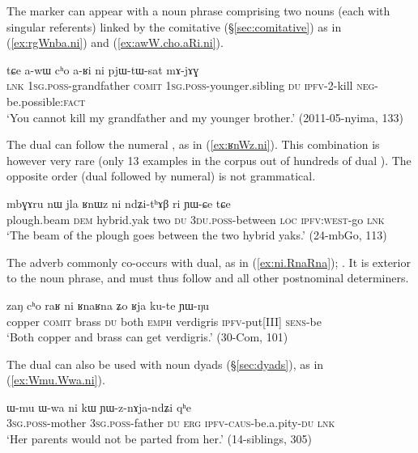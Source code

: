 The marker  can appear with a noun phrase comprising two nouns (each with singular referents) linked by the comitative  (§\ref{sec:comitative}) as in (\ref{ex:rgWnba.ni}) and (\ref{ex:awW.cho.aRi.ni}).

\begin{exe}
	\ex \label{ex:awW.cho.aRi.ni}
	\gll  tɕe a-wɯ cʰo a-ʁi ni pjɯ-tɯ-sat mɤ-jɤɣ \\
	\textsc{lnk} \textsc{1sg}.\textsc{poss}-grandfather \textsc{comit} \textsc{1sg}.\textsc{poss}-younger.sibling \textsc{du} \textsc{ipfv}-2-kill \textsc{neg}-be.possible:\textsc{fact} \\
	\glt `You cannot kill my grandfather and my younger brother.' (2011-05-nyima, 133)
\end{exe}

The dual can follow the numeral , as in (\ref{ex:ʁnWz.ni}). This combination is however very rare (only 13 examples in the corpus out of hundreds of dual ). The opposite order (dual followed by numeral) is not grammatical.

\begin{exe}
\ex \label{ex:ʁnWz.ni}
\gll mbɣɤru nɯ jla ʁnɯz ni ndʑi-tʰɤβ ri ɲɯ-ɕe tɕe \\
plough.beam \textsc{dem} hybrid.yak two \textsc{du} \textsc{3du}.\textsc{poss}-between \textsc{loc} \textsc{ipfv}:\textsc{west}-go \textsc{lnk} \\
\glt `The beam of the plough goes between the two hybrid yaks.' (24-mbGo, 113)
\end{exe}


The adverb  commonly co-occurs with dual, as in (\ref{ex:ni.RnaRna});
. It is exterior to the noun phrase, and must thus follow  and all other postnominal determiners.

\begin{exe}
\ex \label{ex:ni.RnaRna}
\gll zaŋ cʰo raʁ ni ʁnaʁna ʑo ʁja ku-te ɲɯ-ŋu \\
copper \textsc{comit} brass \textsc{du} both \textsc{emph} verdigris \textsc{ipfv}-put[III] \textsc{sens}-be \\
\glt `Both copper and brass can get verdigris.' (30-Com, 101)
\end{exe}

The dual can also be used with noun dyads (§\ref{sec:dyads}), as in (\ref{ex:Wmu.Wwa.ni}). 

\begin{exe}
\ex \label{ex:Wmu.Wwa.ni}
\gll   ɯ-mu ɯ-wa ni kɯ ɲɯ-z-nɤja-ndʑi qʰe \\
\textsc{3sg}.\textsc{poss}-mother \textsc{3sg}.\textsc{poss}-father \textsc{du} \textsc{erg} \textsc{ipfv}-\textsc{caus}-be.a.pity-\textsc{du} \textsc{lnk} \\
\glt `Her parents would not be parted from her.' (14-siblings, 305)
\end{exe}

